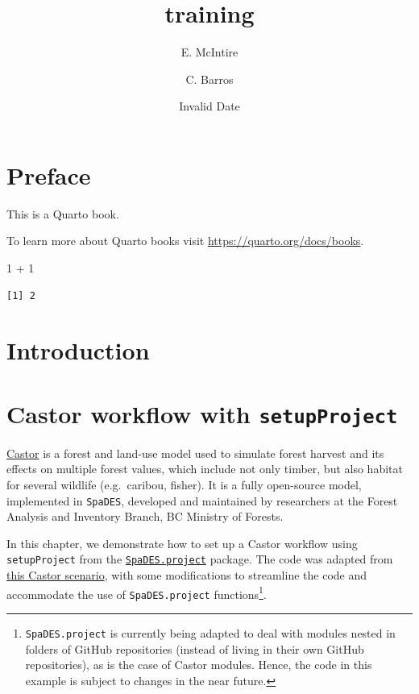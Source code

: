 \documentclass[
  letterpaper,
  DIV=11,
  numbers=noendperiod]{scrreprt}
\title{training}
\author{E. McIntire \and C. Barros}
\date{Invalid Date}
\newenvironment{Shaded}{\begin{snugshade}}{\end{snugshade}}
\newcommand{\DecValTok}[1]{\textcolor[rgb]{0.68,0.00,0.00}{#1}}
\newcommand{\SpecialCharTok}[1]{\textcolor[rgb]{0.37,0.37,0.37}{#1}}
\renewcommand*\contentsname{Table of contents}
\newcommand\contentsname{Table of contents}
\begin{document}
\maketitle

\renewcommand*\contentsname{Table of contents}
{
\hypersetup{linkcolor=}
\setcounter{tocdepth}{2}
\tableofcontents
}

\chapter*{Preface}\label{preface}


This is a Quarto book.

To learn more about Quarto books visit
\url{https://quarto.org/docs/books}.

\begin{Shaded}
\begin{Highlighting}[]
\DecValTok{1} \SpecialCharTok{+} \DecValTok{1}
\end{Highlighting}
\end{Shaded}

\begin{verbatim}
[1] 2
\end{verbatim}


\chapter{Introduction}\label{introduction}


\chapter{\texorpdfstring{Castor workflow with
\texttt{setupProject}}{Castor workflow with setupProject}}\label{castor-workflow-with-setupproject}

\href{https://github.com/bcgov/castor}{Castor} is a forest and land-use
model used to simulate forest harvest and its effects on multiple forest
values, which include not only timber, but also habitat for several
wildlife (e.g.~caribou, fisher). It is a fully open-source model,
implemented in \texttt{SpaDES}, developed and maintained by researchers
at the Forest Analysis and Inventory Branch, BC Ministry of Forests.

In this chapter, we demonstrate how to set up a Castor workflow using
\texttt{setupProject} from the
\href{https://spades-project.predictiveecology.org/}{\texttt{SpaDES.project}}
package. The code was adapted from
\href{https://github.com/bcgov/castor/blob/main/R/scenarios/comparison_stsm/base_case_harvest_flow_20230628.Rmd}{this
Castor scenario}, with some modifications to streamline the code and
accommodate the use of \texttt{SpaDES.project} functions\footnote{\texttt{SpaDES.project}
  is currently being adapted to deal with modules nested in folders of
  GitHub repositories (instead of living in their own GitHub
  repositories), as is the case of Castor modules. Hence, the code in
  this example is subject to changes in the near future.}.
\end{document}
